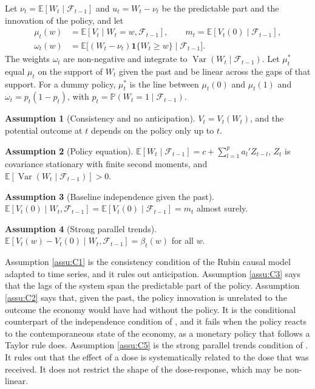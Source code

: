 \documentclass[12pt,a4paper]{article}
\theoremstyle{definition}
\newtheorem{assumption}{Assumption}
\newcommand{\E}{\mathbb{E}}
\newcommand{\var}{\operatorname{Var}}
\begin{document}
Let $\nu_t=\E[W_t\mid\mathcal{F}_{t-1}]$ and $u_t=W_t-\nu_t$ be the predictable part and the innovation of the policy, and let
\begin{equation}
\begin{aligned}
\mu_t(w)&=\E[V_t\mid W_t=w,\mathcal{F}_{t-1}],\qquad m_t=\E[V_t(0)\mid\mathcal{F}_{t-1}],\\
\omega_t(w)&=\E\big[(W_t-\nu_t)\mathbf{1}\{W_t\geq w\}\mid\mathcal{F}_{t-1}\big].
\end{aligned}
\label{eq:objects}
\end{equation}
The weights $\omega_t$ are non-negative and integrate to $\var(W_t\mid\mathcal{F}_{t-1})$. Let $\mu_t^\ast$ equal $\mu_t$ on the support of $W_t$ given the past and be linear across the gaps of that support. For a dummy policy, $\mu_t^\ast$ is the line between $\mu_t(0)$ and $\mu_t(1)$ and $\omega_t=p_t(1-p_t)$, with $p_t=\mathbb{P}(W_t=1\mid\mathcal{F}_{t-1})$.

\begin{assumption}[Consistency and no anticipation\label{assu:C1}]
$V_t=V_t(W_t)$, and the potential outcome at $t$ depends on the policy only up to $t$.
\end{assumption}

\begin{assumption}[Policy equation\label{assu:C3}]
$\E[W_t\mid\mathcal{F}_{t-1}]=c+\sum_{l=1}^pa_l'Z_{t-l}$, $Z_t$ is covariance stationary with finite second moments, and $\E[\var(W_t\mid\mathcal{F}_{t-1})]>0$.
\end{assumption}

\begin{assumption}[Baseline independence given the past\label{assu:C2}]
$\E[V_t(0)\mid W_t,\mathcal{F}_{t-1}]=\E[V_t(0)\mid\mathcal{F}_{t-1}]=m_t$ almost surely.
\end{assumption}

\begin{assumption}[Strong parallel trends\label{assu:C5}]
$\E[V_t(w)-V_t(0)\mid W_t,\mathcal{F}_{t-1}]=\beta_t(w)$ for all $w$.
\end{assumption}

Assumption \ref{assu:C1} is the consistency condition of the Rubin causal model adapted to time series, and it rules out anticipation. Assumption \ref{assu:C3} says that the lags of the system span the predictable part of the policy. Assumption \ref{assu:C2} says that, given the past, the policy innovation is unrelated to the outcome the economy would have had without the policy. It is the conditional counterpart of the independence condition of \citet{RambachanSheppard2021}, and it fails when the policy reacts to the contemporaneous state of the economy, as a monetary policy that follows a Taylor rule does. Assumption \ref{assu:C5} is the strong parallel trends condition of \citet{callawaysantannabacon2021}. It rules out that the effect of a dose is systematically related to the dose that was received. It does not restrict the shape of the dose-response, which may be non-linear.
\end{document}
